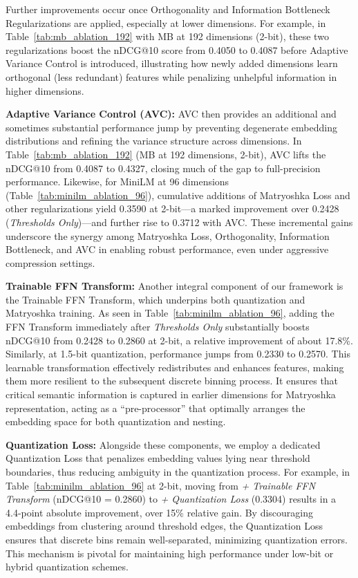 Further improvements occur once Orthogonality and Information Bottleneck Regularizations are applied, especially at lower dimensions. For example, in Table~\ref{tab:mb_ablation_192} with MB at 192 dimensions (2-bit), these two regularizations boost the nDCG@10 score from 0.4050 to 0.4087 before Adaptive Variance Control is introduced, illustrating how newly added dimensions learn orthogonal (less redundant) features while penalizing unhelpful information in higher dimensions.

\noindent
\textbf{Adaptive Variance Control (AVC):}
AVC then provides an additional and sometimes substantial performance jump by preventing degenerate embedding distributions and refining the variance structure across dimensions. In Table~\ref{tab:mb_ablation_192} (MB at 192 dimensions, 2-bit), AVC lifts the nDCG@10 from 0.4087 to 0.4327, closing much of the gap to full-precision performance. Likewise, for MiniLM at 96 dimensions (Table~\ref{tab:minilm_ablation_96}), cumulative additions of Matryoshka Loss and other regularizations yield 0.3590 at 2-bit—a marked improvement over 0.2428 (\textit{Thresholds Only})—and further rise to 0.3712 with AVC. These incremental gains underscore the synergy among Matryoshka Loss, Orthogonality, Information Bottleneck, and AVC in enabling robust performance, even under aggressive compression settings.

\noindent
\textbf{Trainable FFN Transform:}
Another integral component of our framework is the Trainable FFN Transform, which underpins both quantization and Matryoshka training. As seen in Table~\ref{tab:minilm_ablation_96}, adding the FFN Transform immediately after \textit{Thresholds Only} substantially boosts nDCG@10 from 0.2428 to 0.2860 at 2-bit, a relative improvement of about 17.8\%. Similarly, at 1.5-bit quantization, performance jumps from 0.2330 to 0.2570. This learnable transformation effectively redistributes and enhances features, making them more resilient to the subsequent discrete binning process. It ensures that critical semantic information is captured in earlier dimensions for Matryoshka representation, acting as a “pre-processor” that optimally arranges the embedding space for both quantization and nesting.

\noindent
\textbf{Quantization Loss:}
Alongside these components, we employ a dedicated Quantization Loss that penalizes embedding values lying near threshold boundaries, thus reducing ambiguity in the quantization process. For example, in Table~\ref{tab:minilm_ablation_96} at 2-bit, moving from \textit{+ Trainable FFN Transform} (nDCG@10 = 0.2860) to \textit{+ Quantization Loss} (0.3304) results in a 4.4-point absolute improvement, over 15\% relative gain. By discouraging embeddings from clustering around threshold edges, the Quantization Loss ensures that discrete bins remain well-separated, minimizing quantization errors. This mechanism is pivotal for maintaining high performance under low-bit or hybrid quantization schemes.

